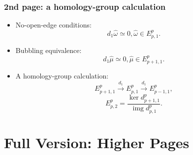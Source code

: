 \documentclass[xcolor=table, 11pt, aspectratio=169]{beamer}
\newcommand{\uone}{\mathrm U(1)}
\DeclareMathOperator{\img}{img}
\begin{document}
\begin{frame}
\frametitle{2nd page: a homology-group calculation}
\begin{itemize}
\item No-open-edge conditions:
\[d_1\hat\omega\simeq 0, \hat\omega\in E^p_{p,1}.\]
\item Bubbling equivalence:
\[d_1\hat\mu\simeq 0, \hat\mu\in E^p_{p+1,1}.\]
\item A homology-group calculation:
\[E^p_{p+1,1}\xrightarrow{d_1}E^p_{p,1}\xrightarrow{d_1}E^p_{p-1,1},\]
\[E^p_{p,2}=\frac{\ker d^p_{p+1,1}}{\img d^p_{p,1}}.\]
\end{itemize}
\end{frame}







\section{Full Version: Higher Pages}
\end{document}
